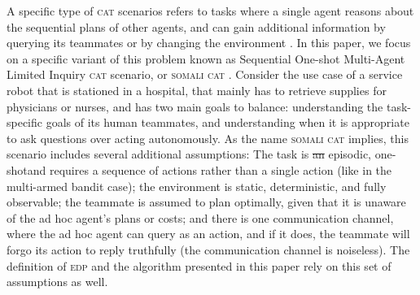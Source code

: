 \documentclass[letterpaper]{article}
\providecommand{\DIFaddtex}[1]{{\protect\color{blue}\uwave{#1}}} %
\providecommand{\DIFdeltex}[1]{{\protect\color{red}\sout{#1}}}                      %
\providecommand{\DIFaddbegin}{} %
\providecommand{\DIFaddend}{} %
\providecommand{\DIFdelbegin}{} %
\providecommand{\DIFdelend}{} %
\providecommand{\DIFadd}[1]{\texorpdfstring{\DIFaddtex{#1}}{#1}} %
\providecommand{\DIFdel}[1]{\texorpdfstring{\DIFdeltex{#1}}{}} %
\newcommand{\DIFscaledelfig}{0.5}
\newlength{\DIFdelgraphicswidth} %
\newlength{\DIFdelgraphicsheight} %
\newcommand{\DIFaddincludegraphics}[2][]{{\color{blue}\fbox{\DIFOincludegraphics[#1]{#2}}}} %
\newcommand{\DIFdelincludegraphics}[2][]{%
\sbox{\DIFdelgraphicsbox}{\DIFOincludegraphics[#1]{#2}}%
\settoboxwidth{\DIFdelgraphicswidth}{\DIFdelgraphicsbox} %
\settoboxtotalheight{\DIFdelgraphicsheight}{\DIFdelgraphicsbox} %
\scalebox{\DIFscaledelfig}{%
\parbox[b]{\DIFdelgraphicswidth}{\usebox{\DIFdelgraphicsbox}\\[-\baselineskip] \rule{\DIFdelgraphicswidth}{0em}}\llap{\resizebox{\DIFdelgraphicswidth}{\DIFdelgraphicsheight}{%
\setlength{\unitlength}{\DIFdelgraphicswidth}%
\begin{picture}(1,1)%
\thicklines\linethickness{2pt} %
{\color[rgb]{1,0,0}\put(0,0){\framebox(1,1){}}}%
{\color[rgb]{1,0,0}\put(0,0){\line( 1,1){1}}}%
{\color[rgb]{1,0,0}\put(0,1){\line(1,-1){1}}}%
\end{picture}%
}\hspace*{3pt}}} %
} %
\DeclareRobustCommand{\DIFaddbegin}{\DIFOaddbegin \let\includegraphics\DIFaddincludegraphics} %
\DeclareRobustCommand{\DIFaddend}{\DIFOaddend \let\includegraphics\DIFOincludegraphics} %
\DeclareRobustCommand{\DIFdelbegin}{\DIFOdelbegin \let\includegraphics\DIFdelincludegraphics} %
\DeclareRobustCommand{\DIFdelend}{\DIFOaddend \let\includegraphics\DIFOincludegraphics} %
\begin{document}
A specific type of \textsc{cat} scenarios refers to tasks where a single agent reasons about the sequential plans of other agents, and can gain additional information by querying its teammates or by changing the environment \cite{mirsky2018sequential,mirskypenny,shvo2020active}. In this paper, we focus on a specific variant of this problem known as Sequential One-shot Multi-Agent Limited Inquiry \textsc{cat} scenario, or \textsc{somali cat} \cite{mirskypenny}. Consider the use case of a service robot that is stationed in a hospital, that mainly has to retrieve supplies for physicians or nurses, and has two main goals to balance: understanding the task-specific goals of its human teammates, and understanding when it is appropriate to ask questions over acting autonomously. As the name \textsc{somali cat} implies, this scenario includes several additional assumptions: The task is \DIFdelbegin \DIFdel{an }\DIFdelend episodic, one-shot\DIFaddbegin \DIFadd{, }\DIFaddend and requires a sequence of actions rather than a single action (like in the multi-armed bandit case); the environment is static, deterministic, and fully observable; the teammate is assumed to plan optimally, given that it is unaware of the ad hoc agent's plans or costs; and there is one communication channel, where the ad hoc agent can query as an action, and if it does, the teammate will forgo its action to reply truthfully (the communication channel is noiseless). The definition of \textsc{edp} and the algorithm presented in this paper rely on this set of assumptions as well.

\end{document}
